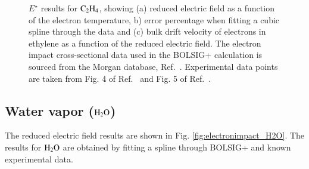 \begin{figure}[!htbp]
\caption{$E^\star$ results for $\rm C_2H_4$, showing (a) reduced electric field as a function of the electron temperature, b) error percentage when fitting a cubic spline through the data and (c) bulk drift velocity of electrons in ethylene as a function of the reduced electric field. The electron impact cross-sectional data used in the BOLSIG+ calculation is sourced from the Morgan database, Ref.\ \cite{lxc:2024:morgan}. Experimental data points are taken from Fig. 4 of Ref.\ \cite{jop:2011:takatou} and Fig. 5 of Ref.\ \cite{psst:2020:pinhao}.}
\label{fig:electronimpact_C2H4}
\end{figure}
%

\subsection{Water vapor ($\rm H_2O$)}

The reduced electric field results are shown in Fig. \ref{fig:electronimpact_H2O}. The results for $\rm H_2O$ are obtained by fitting a spline through BOLSIG+ and known experimental data.
%

